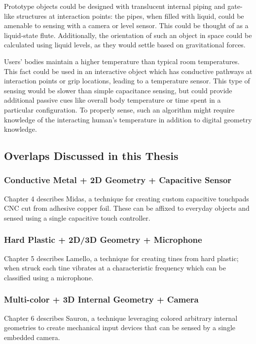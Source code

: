     Prototype objects could be designed with translucent internal piping and gate-like structures at interaction points: the pipes, when filled with liquid, could be amenable to sensing with a camera or level sensor. This could be thought of as a liquid-state flute. Additionally, the orientation of such an object in space could be calculated using liquid levels, as they would settle based on gravitational forces.
    
    Users' bodies maintain a higher temperature than typical room temperatures. This fact could be used in an interactive object which has conductive pathways at interaction points or grip locations, leading to a temperature sensor. This type of sensing would be slower than simple capacitance sensing, but could provide additional passive cues like overall body temperature or time spent in a particular configuration. To properly sense, such an algorithm might require knowledge of the interacting human's temperature in addition to digital geometry knowledge.
    
\subsection{Overlaps Discussed in this Thesis}

    \subsubsection{Conductive Metal + 2D Geometry + Capacitive Sensor}
    
    Chapter 4 describes Midas, a technique for creating custom capacitive touchpads CNC cut from adhesive copper foil. These can be affixed to everyday objects and sensed using a single capacitive touch controller.
    
    \subsubsection{Hard Plastic + 2D/3D Geometry + Microphone}
    
    Chapter 5 describes Lamello, a technique for creating tines from hard plastic; when struck each tine vibrates at a characteristic frequency which can be classified using a microphone.
    
    \subsubsection{Multi-color + 3D Internal Geometry + Camera}
    
    Chapter 6 describes Sauron, a technique leveraging colored arbitrary internal geometries to create mechanical input devices that can be sensed by a single embedded camera.